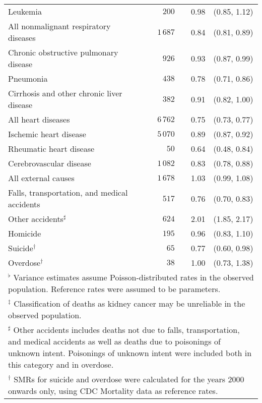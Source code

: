 \documentclass[]{article}
\begin{document}
\begin{table}[H]
\begin{tabular}{lrrl}
  Leukemia & $200$ & 0.98 &  (0.85, 1.12) \\ 
  \hspace{10pt}All nonmalignant respiratory diseases & $1\,687$ & 0.84 &  (0.81, 0.89) \\ 
  \hspace{10pt}Chronic obstructive pulmonary disease & $926$ & 0.93 &  (0.87, 0.99) \\ 
  Pneumonia & $438$ & 0.78 &  (0.71, 0.86) \\ 
  Cirrhosis and other chronic liver disease & $382$ & 0.91 &  (0.82, 1.00) \\ 
  \hspace{10pt}All heart diseases & $6\,762$ & 0.75 &  (0.73, 0.77) \\ 
  \hspace{10pt}Ischemic heart disease & $5\,070$ & 0.89 &  (0.87, 0.92) \\ 
  Rheumatic heart disease & $50$ & 0.64 &  (0.48, 0.84) \\ 
  Cerebrovascular disease & $1\,082$ & 0.83 &  (0.78, 0.88) \\ 
  \hspace{10pt}All external causes & $1\,678$ & 1.03 &  (0.99, 1.08) \\ 
  \hspace{10pt}Falls, transportation, and medical accidents & $517$ & 0.76 &  (0.70, 0.83) \\ 
  \hspace{10pt}Other accidents$^\sharp$ & $624$ & 2.01 &  (1.85, 2.17) \\ 
  \hspace{10pt}Homicide & $195$ & 0.96 &  (0.83, 1.10) \\ 
  \hspace{10pt}Suicide$^\dagger$ & $65$ & 0.77 &  (0.60, 0.98) \\ 
  \hspace{10pt}Overdose$^\dagger$ & $38$ & 1.00 &  (0.73, 1.38) \\ 
   \hline 
\multicolumn{4}{p{0.675\textwidth}}{\footnotesize$^\flat$ Variance estimates assume Poisson-distributed rates in the observed population. Reference rates were assumed to be parameters.}\\
\multicolumn{4}{p{0.675\textwidth}}{\footnotesize$^\ddagger$ Classification of deaths as kidney cancer may be unreliable in the observed population.}\\
\multicolumn{4}{p{0.675\textwidth}}{\footnotesize$^\sharp$ Other accidents includes deaths not due to falls, transportation, and medical accidents as well as deaths due to poisonings of unknown intent. Poisonings of unknown intent were included both in this category and in overdose.}\\
\multicolumn{4}{p{0.675\textwidth}}{\footnotesize$^\dagger$ SMRs for suicide and overdose were calculated for the years 2000 onwards only, using CDC Mortality data as reference rates.}\\ \bottomrule
\end{tabular}
\end{table}
\end{document}
